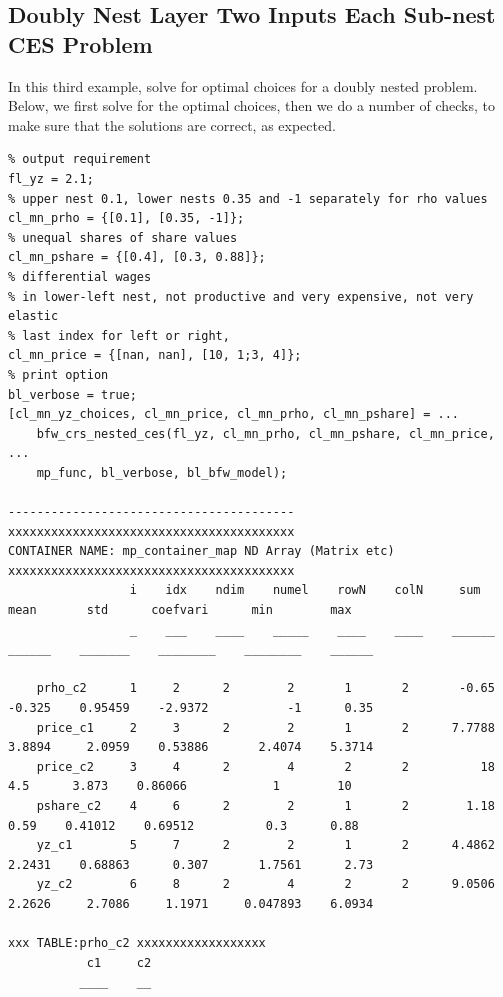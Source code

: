 \documentclass[
]{book}
\begin{document}
\hypertarget{doubly-nest-layer-two-inputs-each-sub-nest-ces-problem}{%
\subsection{Doubly Nest Layer Two Inputs Each Sub-nest CES Problem}\label{doubly-nest-layer-two-inputs-each-sub-nest-ces-problem}}

In this third example, solve for optimal choices for a doubly nested
problem. Below, we first solve for the optimal choices, then we do a
number of checks, to make sure that the solutions are correct, as
expected.

\begin{verbatim}
% output requirement
fl_yz = 2.1;
% upper nest 0.1, lower nests 0.35 and -1 separately for rho values
cl_mn_prho = {[0.1], [0.35, -1]};
% unequal shares of share values
cl_mn_pshare = {[0.4], [0.3, 0.88]};
% differential wages
% in lower-left nest, not productive and very expensive, not very elastic
% last index for left or right,
cl_mn_price = {[nan, nan], [10, 1;3, 4]};
% print option
bl_verbose = true;
[cl_mn_yz_choices, cl_mn_price, cl_mn_prho, cl_mn_pshare] = ...
    bfw_crs_nested_ces(fl_yz, cl_mn_prho, cl_mn_pshare, cl_mn_price, ...
    mp_func, bl_verbose, bl_bfw_model);

----------------------------------------
xxxxxxxxxxxxxxxxxxxxxxxxxxxxxxxxxxxxxxxx
CONTAINER NAME: mp_container_map ND Array (Matrix etc)
xxxxxxxxxxxxxxxxxxxxxxxxxxxxxxxxxxxxxxxx
                 i    idx    ndim    numel    rowN    colN     sum       mean       std      coefvari      min        max  
                 _    ___    ____    _____    ____    ____    ______    ______    _______    ________    ________    ______

    prho_c2      1     2      2        2       1       2       -0.65    -0.325    0.95459    -2.9372           -1      0.35
    price_c1     2     3      2        2       1       2      7.7788    3.8894     2.0959    0.53886       2.4074    5.3714
    price_c2     3     4      2        4       2       2          18       4.5      3.873    0.86066            1        10
    pshare_c2    4     6      2        2       1       2        1.18      0.59    0.41012    0.69512          0.3      0.88
    yz_c1        5     7      2        2       1       2      4.4862    2.2431    0.68863      0.307       1.7561      2.73
    yz_c2        6     8      2        4       2       2      9.0506    2.2626     2.7086     1.1971     0.047893    6.0934

xxx TABLE:prho_c2 xxxxxxxxxxxxxxxxxx
           c1     c2
          ____    __


\end{verbatim}
\end{document}
